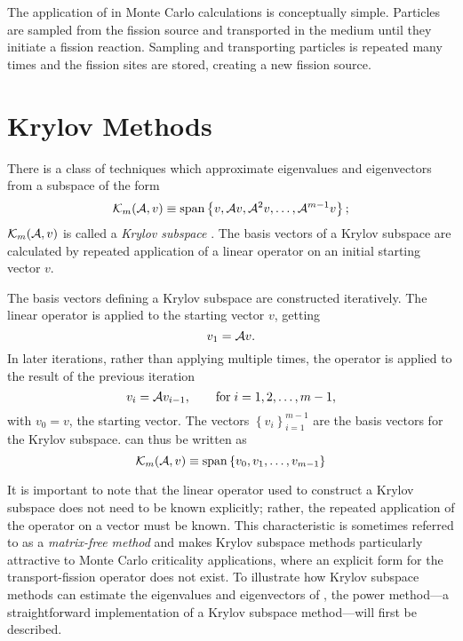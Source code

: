 The application of \A{} in Monte Carlo calculations is conceptually simple.  Particles are sampled from the fission source and transported in the medium until they initiate a fission reaction.  Sampling and transporting particles is repeated many times and the fission sites are stored, creating a new fission source.

\section{Krylov Methods \label{sec:KrylovMethods}}
There is a class of techniques which approximate eigenvalues and eigenvectors from a subspace of the form
\begin{equation}
    \mathcal{K}_m(\mathcal{A}, v) \equiv \operatorname{span}\left\{v, \mathcal{A} v, \mathcal{A}^2v, \ldots, \mathcal{A}^{m-1}v\right\};
    \label{eq:KrylovSubspace}
\end{equation}
$\mathcal{K}_m(\mathcal{A}, v)$ is called a \emph{Krylov subspace} \citep[see][chapter VI]{Saad:1992Numer-0}.  The basis vectors of a Krylov subspace are calculated by repeated application of a linear operator \A{} on an initial starting vector $v$.  

The basis vectors defining a Krylov subspace are constructed iteratively. The linear operator \A{} is applied to the starting vector $v$, getting \[v_1 = \mathcal{A} v.\]  In later iterations, rather than applying \A{} multiple times, the operator is applied to the result of the previous iteration 
\begin{equation}
    v_i = \mathcal{A} v_{i-1}, \qquad \mathrm{for}\; i=1,2,\ldots, m-1,
    \label{eq:KrylovLinearOperation}
\end{equation}
with $v_0 = v$, the starting vector.  The vectors $\left\{v_i\right\}_{i=1}^{m-1}$ are the basis vectors for the Krylov subspace.   can thus be written as
\begin{equation}
    \mathcal{K}_m(\mathcal{A}, v) \equiv \operatorname{span}\left\{v_0, v_1, \ldots, v_{m-1}\right\}
    \label{eq:KrylovSubspaceBasisVectors}
\end{equation}

It is important to note that the linear operator used to construct a Krylov subspace does not need to be known explicitly; rather, the repeated application of the operator on a vector must be known.  This characteristic is sometimes referred to as a \emph{matrix-free method} and makes Krylov subspace methods particularly attractive to Monte Carlo criticality applications, where an explicit form for the transport-fission operator does not exist.  To illustrate how Krylov subspace methods can estimate the eigenvalues and eigenvectors of \A{}, the power method---a straightforward implementation of a Krylov subspace method---will first be described.

